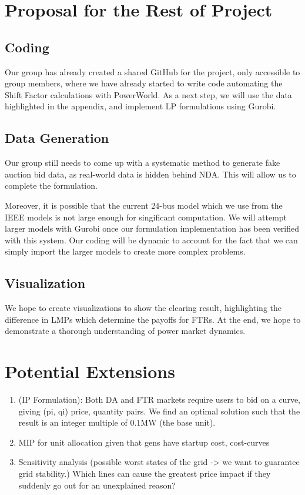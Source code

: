 \documentclass[11pt]{article}
\begin{document}
\newpage

\section{Proposal for the Rest of Project}

\subsection{Coding}
Our group has already created a shared GitHub for the project, only accessible to group members, where we have already started to write code automating the Shift Factor calculations with PowerWorld. As a next step, we will use the data highlighted in the appendix, and implement LP formulations using Gurobi.

\subsection{Data Generation}
Our group still needs to come up with a systematic method to generate fake auction bid data, as real-world data is hidden behind NDA. This will allow us to complete the formulation.

Moreover, it is possible that the current 24-bus model which we use from the IEEE models is not large enough for singificant computation. We will attempt larger models with Gurobi once our formulation implementation has been verified with this system. Our coding will be dynamic to account for the fact that we can simply import the larger models to create more complex problems.

\subsection{Visualization}

We hope to create visualizations to show the clearing result, highlighting the difference in LMPs which determine the payoffs for FTRs. At the end, we hope to demonstrate a thorough understanding of power market dynamics.

\section{Potential Extensions}
\begin{enumerate}
    \item (IP Formulation): Both DA and FTR markets require users to bid on a curve, giving (pi, qi) price, quantity pairs. We find an optimal solution such that the result is an integer multiple of $0.1\text{MW}$ (the base unit).
    \item MIP for unit allocation given that gens have startup cost, cost-curves
    \item Sensitivity analysis (possible worst states of the grid -> we want to guarantee grid stability.) Which lines can cause the greatest price impact if they suddenly go out for an unexplained reason?
\end{enumerate}
\end{document}
